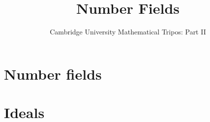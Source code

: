 \documentclass{article}
\title{Number Fields}
\author{Cambridge University Mathematical Tripos: Part II}
\begin{document}
\maketitle

\tableofcontentsnewpage{}

\section{Number fields}

\section{Ideals}

\end{document}
